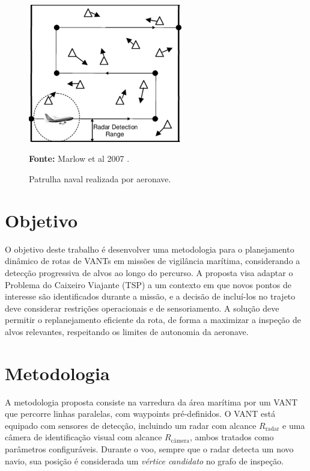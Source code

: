 \documentclass[12 pt]{article}
\begin{document}
\begin{figure}[H]
    \centering
    \includegraphics[width=0.6\textwidth]{fig/vant.png}
    \caption{Patrulha naval realizada por aeronave.}

    \small
    \textbf{Fonte:} Marlow et al 2007 \cite{marlow_2007}.
 \end{figure}

\section{Objetivo}
O objetivo deste trabalho é desenvolver uma metodologia para o planejamento dinâmico de rotas de VANTs em missões de vigilância marítima, considerando a detecção progressiva de alvos ao longo do percurso. A proposta visa adaptar o Problema do Caixeiro Viajante (TSP) a um contexto em que novos pontos de interesse são identificados durante a missão, e a decisão de incluí-los no trajeto deve considerar restrições operacionais e de sensoriamento. A solução deve permitir o replanejamento eficiente da rota, de forma a maximizar a inspeção de alvos relevantes, respeitando os limites de autonomia da aeronave.

\section{Metodologia}
A metodologia proposta consiste na varredura da área marítima por um VANT que percorre linhas paralelas, com waypoints pré-definidos. O VANT está equipado com sensores de detecção, incluindo um radar com alcance \( R_{\text{radar}} \) e uma câmera de identificação visual com alcance \( R_{\text{câmera}} \), ambos tratados como parâmetros configuráveis. Durante o voo, sempre que o radar detecta um novo navio, sua posição é considerada um \textit{vértice candidato} no grafo de inspeção.
\end{document}
